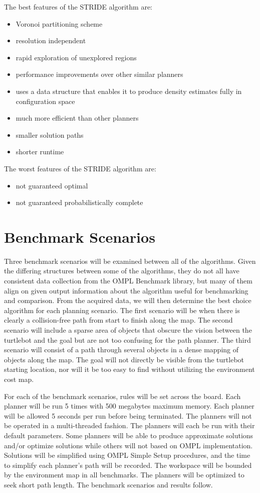 \documentclass[conference]{IEEEtran} \usepackage[T1]{fontenc} \usepackage[backend=biber, style=ieee]{biblatex}
\begin{document}
The best features of the STRIDE algorithm are:
\begin{itemize}
 \item Voronoi partitioning scheme
 \item resolution independent
 \item rapid exploration of unexplored regions
 \item performance improvements over other similar planners
 \item uses a data structure that enables it to produce density estimates fully in configuration space
 \item much more efficient than other planners
 \item smaller solution paths
 \item shorter runtime
\end{itemize}

The worst features of the STRIDE algorithm are:
\begin{itemize}
 \item not guaranteed optimal
 \item not guaranteed probabilistically complete
\end{itemize}

\section{Benchmark Scenarios} \label{Benchmark Scenarios}

Three benchmark scenarios will be examined between all of the algorithms. Given the differing structures between some of the algorithms, they do not all
have consistent data collection from the OMPL Benchmark library, but many of them align on given output information about the algorithm useful for benchmarking
and comparison. From the acquired data, we will then determine the best choice algorithm for each planning scenario. The first scenario will be when there is clearly a 
collision-free path from start to finish along the map. The second scenario will include a sparse area of objects that obscure the vision between the turtlebot and 
the goal but are not too confusing for the path planner. The third scenario will consist of a path through several objects in a dense mapping of objects along the map. 
The goal will not directly be visible from the turtlebot starting location, nor will it be too easy to find without utilizing the environment cost map.

For each of the benchmark scenarios, rules will be set across the board. Each planner will be run 5 times with 500 megabytes maximum memory. Each planner will be allowed 5 
seconds per run before being terminated. The planners will not be operated in a multi-threaded fashion. The planners will each be run with their default parameters. Some 
planners will be able to produce approximate solutions and/or optimize solutions while others will not based on OMPL implementation. Solutions will be simplified using OMPL 
Simple Setup procedures, and the time to simplify each planner's path will be recorded. The workspace will be bounded by the environment map in all benchmarks. The planners 
will be optimized to seek short path length. The benchmark scenarios and results follow.
\end{document}

